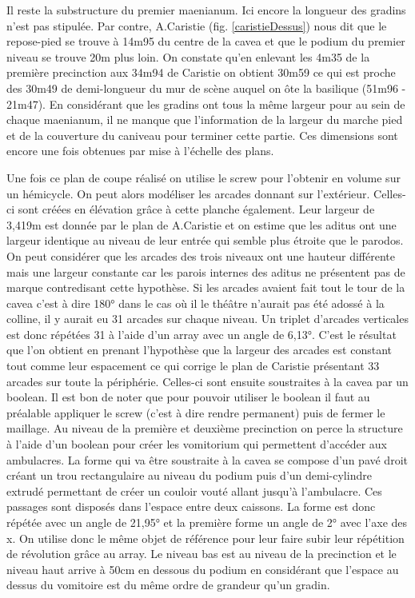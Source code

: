 Il reste la substructure du premier maenianum. Ici encore la longueur des gradins n'est pas stipulée. Par contre, A.Caristie (fig. \ref{caristieDessus}) nous dit que le repose-pied se trouve à 14m95 du centre de la cavea et que le podium du premier niveau se trouve 20m plus loin. On constate qu'en enlevant les 4m35 de la première precinction aux 34m94 de Caristie on obtient 30m59 ce qui est proche des 30m49 de demi-longueur du mur de scène auquel on ôte la basilique (51m96 - 21m47). En considérant que les gradins ont tous la même largeur pour au sein de chaque maenianum, il ne manque que l'information de la largeur du marche pied et de la couverture du caniveau pour terminer cette partie. Ces dimensions sont encore une fois obtenues par mise à l'échelle des plans.

		
Une fois ce plan de coupe réalisé on utilise le \gls{screw} pour l'obtenir en volume sur un hémicycle. On peut alors modéliser les arcades donnant sur l'extérieur. Celles-ci sont créées en élévation grâce à cette planche également. Leur largeur de 3,419m est donnée par le plan de A.Caristie \cite[Pl. XXXIII]{orangePl} et on estime que les \gls{aditus} ont une largeur identique au niveau de leur entrée qui semble plus étroite que le \gls{parodos}. On peut considérer que les arcades des trois niveaux ont une hauteur différente mais une largeur constante car les parois internes des \gls{aditus} ne présentent pas de marque contredisant cette hypothèse. Si les arcades avaient fait tout le tour de la cavea c'est à dire 180° dans le cas où il le théâtre n'aurait pas été adossé à la colline, il y aurait eu 31 arcades sur chaque niveau. Un triplet d'arcades verticales est donc répétées 31 à l'aide d'un \gls{array} avec un angle de 6,13°. C'est le résultat que l'on obtient en prenant l'hypothèse que la largeur des arcades est constant tout comme leur espacement ce qui corrige le plan de Caristie présentant 33 arcades sur toute la périphérie. Celles-ci sont ensuite soustraites à la \gls{cavea} par un \gls{boolean}. Il est bon de noter que pour pouvoir utiliser le \gls{boolean} il faut au préalable appliquer le \gls{screw} (c'est à dire rendre permanent) puis de fermer le maillage. Au niveau de la première et deuxième \gls{precinction} on perce la structure à l'aide d'un \gls{boolean} pour créer les \gls{vomitorium} qui permettent d'accéder aux ambulacres. La forme qui va être soustraite à la cavea se compose d'un pavé droit créant un trou rectangulaire au niveau du podium puis d'un demi-cylindre extrudé permettant de créer un couloir vouté allant jusqu'à l'ambulacre. Ces passages sont disposés dans l'espace entre deux caissons. La forme est donc répétée avec un angle de 21,95° et la première forme un angle de 2° avec l'axe des x. On utilise donc le même objet de référence pour leur faire subir leur répétition de révolution grâce au \gls{array}. Le niveau bas est au niveau de la \gls{precinction} et le niveau haut arrive à 50cm en dessous du podium en considérant que l'espace au dessus du vomitoire est du même ordre de grandeur qu'un gradin. 

